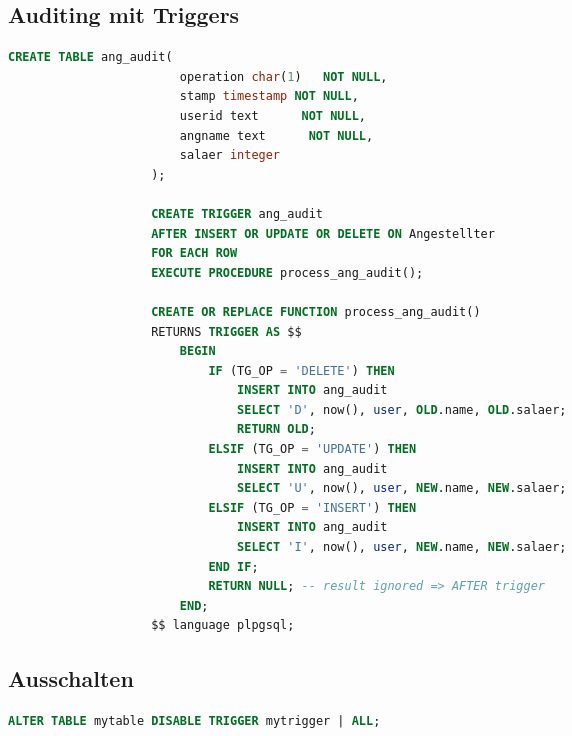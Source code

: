 \documentclass[a4paper, landscape, 8pt]{scrartcl}
\begin{document}
\begin{multicols*}{4}
        \subsection{Auditing mit Triggers}
        \begin{lstlisting}[language=sql]
                    CREATE TABLE ang_audit(
                        operation char(1)   NOT NULL,
                        stamp timestamp NOT NULL,
                        userid text      NOT NULL,
                        angname text      NOT NULL,
                        salaer integer
                    );

                    CREATE TRIGGER ang_audit
                    AFTER INSERT OR UPDATE OR DELETE ON Angestellter
                    FOR EACH ROW
                    EXECUTE PROCEDURE process_ang_audit();

                    CREATE OR REPLACE FUNCTION process_ang_audit()
                    RETURNS TRIGGER AS $$
                        BEGIN
                            IF (TG_OP = 'DELETE') THEN
                                INSERT INTO ang_audit
                                SELECT 'D', now(), user, OLD.name, OLD.salaer;
                                RETURN OLD;
                            ELSIF (TG_OP = 'UPDATE') THEN
                                INSERT INTO ang_audit
                                SELECT 'U', now(), user, NEW.name, NEW.salaer;
                            ELSIF (TG_OP = 'INSERT') THEN
                                INSERT INTO ang_audit
                                SELECT 'I', now(), user, NEW.name, NEW.salaer;
                            END IF;
                            RETURN NULL; -- result ignored => AFTER trigger
                        END;
                    $$ language plpgsql;
        \end{lstlisting}

        \subsection{Ausschalten}
        \begin{lstlisting}[language=sql]
                    ALTER TABLE mytable DISABLE TRIGGER mytrigger | ALL;
        \end{lstlisting}


\end{multicols*}
\end{document}
